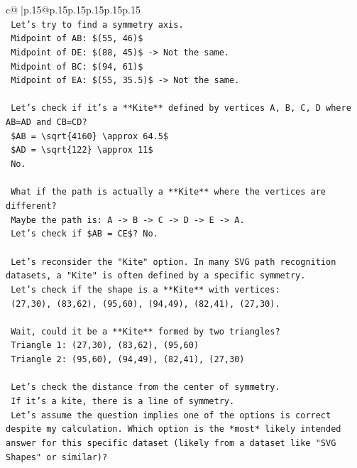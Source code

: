 \documentclass{article}
\begin{document}
{\begin{supertabular}{c@{$\;$}|p{.15\linewidth}@{}p{.15\linewidth}p{.15\linewidth}p{.15\linewidth}p{.15\linewidth}p{.15\linewidth}}
{{{\\ 
\texttt{    Let's try to find a symmetry axis.} \\
\texttt{    Midpoint of AB: \$(55, 46)\$} \\
\texttt{    Midpoint of DE: \$(88, 45)\$ {-}> Not the same.} \\
\texttt{    Midpoint of BC: \$(94, 61)\$} \\
\texttt{    Midpoint of EA: \$(55, 35.5)\$ {-}> Not the same.} \\
\\ 
\texttt{    Let's check if it's a **Kite** defined by vertices A, B, C, D where AB=AD and CB=CD?} \\
\texttt{    \$AB = \textbackslash{}sqrt\{4160\} \textbackslash{}approx 64.5\$} \\
\texttt{    \$AD = \textbackslash{}sqrt\{122\} \textbackslash{}approx 11\$} \\
\texttt{    No.} \\
\\ 
\texttt{    What if the path is actually a **Kite** where the vertices are different?} \\
\texttt{    Maybe the path is: A {-}> B {-}> C {-}> D {-}> E {-}> A.} \\
\texttt{    Let's check if \$AB = CE\$? No.} \\
\\ 
\texttt{    Let's reconsider the "Kite" option. In many SVG path recognition datasets, a "Kite" is often defined by a specific symmetry.} \\
\texttt{    Let's check if the shape is a **Kite** with vertices:} \\
\texttt{    (27,30), (83,62), (95,60), (94,49), (82,41), (27,30).} \\
\\ 
\texttt{    Wait, could it be a **Kite** formed by two triangles?} \\
\texttt{    Triangle 1: (27,30), (83,62), (95,60)} \\
\texttt{    Triangle 2: (95,60), (94,49), (82,41), (27,30)} \\
\\ 
\texttt{    Let's check the distance from the center of symmetry.} \\
\texttt{    If it's a kite, there is a line of symmetry.} \\
\texttt{    Let's assume the question implies one of the options is correct despite my calculation. Which option is the *most* likely intended answer for this specific dataset (likely from a dataset like "SVG Shapes" or similar)?} \\
}}}
\end{supertabular}}
\end{document}
